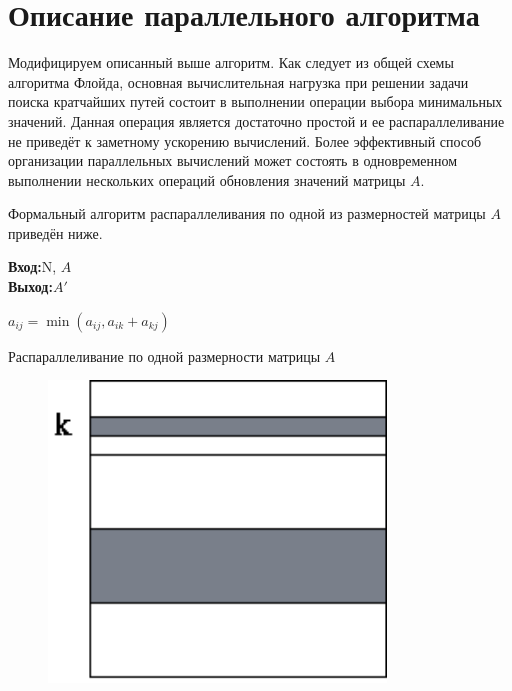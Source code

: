 \documentclass[a4paper,12pt]{report}
\renewcommand{\algorithmicrequire}{\textbf{Вход:}}
\renewcommand{\algorithmicensure}{\textbf{Выход:}}
\begin{document}
\section*{Описание параллельного алгоритма}
	\par Модифицируем описанный выше алгоритм. Как следует из общей схемы алгоритма Флойда, основная вычислительная нагрузка при решении задачи поиска кратчайших путей состоит в выполнении операции выбора минимальных значений. Данная операция является достаточно простой и ее распараллеливание не приведёт к заметному ускорению вычислений. Более эффективный способ организации параллельных вычислений может состоять в одновременном выполнении нескольких операций обновления значений матрицы $A$. 
	\par Формальный алгоритм распараллеливания по одной из размерностей матрицы $A$ приведён ниже.\\
\begin{minipage}{0.55\textwidth}
\begin{algorithm}[H]
	\algorithmicrequire{N, $A$}\\
 	\algorithmicensure{$A'$}
	\begin{algorithmic}[1]
					\STATE $a_{ij} = \min(a_{ij}, a_{ik} + a_{kj})$
				\ENDFOR
			\ENDFOR
		\ENDFOR
	\end{algorithmic}
	\caption{Распараллеливание по одной размерности матрицы $A$}
	\label{alg:seq}
\end{algorithm}
\end{minipage}
\begin{minipage}{0.4\textwidth}
\vspace{30pt}
\begin{figure}[H]
\includegraphics[width=0.8\textwidth]{./par1.png}
\end{figure}
\vspace{10pt}
\end{minipage}
\end{document}
